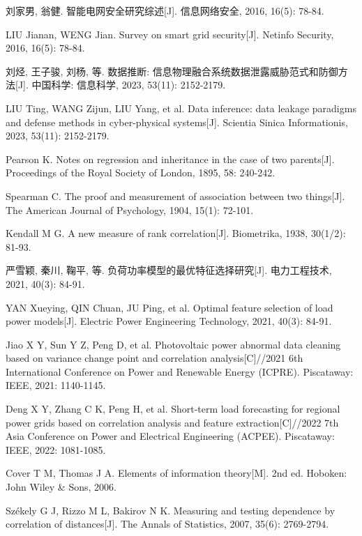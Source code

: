 刘家男, 翁健. 智能电网安全研究综述[J]. 信息网络安全, 2016, 16(5): 78-84.

LIU Jianan, WENG Jian. Survey on smart grid security[J]. Netinfo Security, 2016, 16(5): 78-84.

刘烃, 王子骏, 刘杨, 等. 数据推断: 信息物理融合系统数据泄露威胁范式和防御方法[J]. 中国科学: 信息科学, 2023, 53(11): 2152-2179.

LIU Ting, WANG Zijun, LIU Yang, et al. Data inference: data leakage paradigms and defense methods in cyber-physical systems[J]. Scientia Sinica Informationis, 2023, 53(11): 2152-2179.

Pearson K. Notes on regression and inheritance in the case of two parents[J]. Proceedings of the Royal Society of London, 1895, 58: 240-242.

Spearman C. The proof and measurement of association between two things[J]. The American Journal of Psychology, 1904, 15(1): 72-101.

Kendall M G. A new measure of rank correlation[J]. Biometrika, 1938, 30(1/2): 81-93.

严雪颖, 秦川, 鞠平, 等. 负荷功率模型的最优特征选择研究[J]. 电力工程技术, 2021, 40(3): 84-91.

YAN Xueying, QIN Chuan, JU Ping, et al. Optimal feature selection of load power models[J]. Electric Power Engineering Technology, 2021, 40(3): 84-91.

Jiao X Y, Sun Y Z, Peng D, et al. Photovoltaic power abnormal data cleaning based on variance change point and correlation analysis[C]//2021 6th International Conference on Power and Renewable Energy (ICPRE). Piscataway: IEEE, 2021: 1140-1145.

Deng X Y, Zhang C K, Peng H, et al. Short-term load forecasting for regional power grids based on correlation analysis and feature extraction[C]//2022 7th Asia Conference on Power and Electrical Engineering (ACPEE). Piscataway: IEEE, 2022: 1081-1085.

Cover T M, Thomas J A. Elements of information theory[M]. 2nd ed. Hoboken: John Wiley \& Sons, 2006.

Székely G J, Rizzo M L, Bakirov N K. Measuring and testing dependence by correlation of distances[J]. The Annals of Statistics, 2007, 35(6): 2769-2794.

